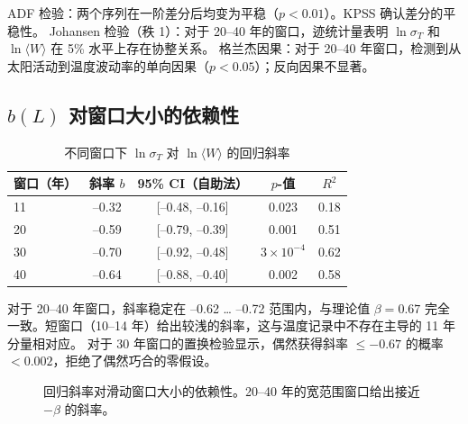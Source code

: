 \documentclass[12pt,a4paper]{article}
\newcommand{\be}{\beta}
\begin{document}
	ADF 检验：两个序列在一阶差分后均变为平稳（\(p < 0.01\)）。KPSS 确认差分的平稳性。
	Johansen 检验（秩 1）：对于 20–40 年的窗口，迹统计量表明 \(\ln \sigma_T\) 和 \(\ln \langle W \rangle\) 在 5\% 水平上存在协整关系。
	格兰杰因果：对于 20–40 年窗口，检测到从太阳活动到温度波动率的单向因果（\(p < 0.05\)）；反向因果不显著。
	
	\subsection{\(b(L)\) 对窗口大小的依赖性}
	
	\begin{table}[htbp]
		\centering
		\caption{不同窗口下 \(\ln \sigma_T\) 对 \(\ln \langle W \rangle\) 的回归斜率}
		\label{tab:slopes}
		\begin{tabular}{@{}lcccc@{}}
			\toprule
			窗口（年） & 斜率 \(b\) & 95\% CI（自助法） & \(p\)-值 & \(R^2\) \\
			\midrule
			11 & –0.32 & [–0.48, –0.16] & 0.023 & 0.18 \\
			20 & –0.59 & [–0.79, –0.39] & 0.001 & 0.51 \\
			30 & –0.70 & [–0.92, –0.48] & \(3\times10^{-4}\) & 0.62 \\
			40 & –0.64 & [–0.88, –0.40] & 0.002 & 0.58 \\
			\bottomrule
		\end{tabular}
	\end{table}
	
	对于 20–40 年窗口，斜率稳定在 –0.62 … –0.72 范围内，与理论值 \(\be = 0.67\) 完全一致。短窗口（10–14 年）给出较浅的斜率，这与温度记录中不存在主导的 11 年分量相对应。
	对于 30 年窗口的置换检验显示，偶然获得斜率 \(\le -0.67\) 的概率 \(<0.002\)，拒绝了偶然巧合的零假设。
	
	\begin{figure}[htbp]
		\centering
		\caption{回归斜率对滑动窗口大小的依赖性。20–40 年的宽范围窗口给出接近 \(-\be\) 的斜率。}
		\label{fig:slope_vs_window}
	\end{figure}
	
\end{document}
